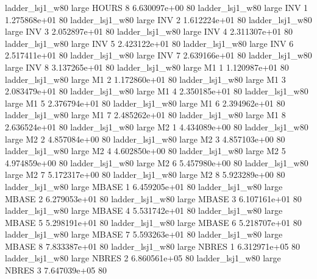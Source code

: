     ladder_lsj1_w80      large    HOURS                 8 6.630097e+00 80
    ladder_lsj1_w80      large      INV                 1 1.275868e+01 80
    ladder_lsj1_w80      large      INV                 2 1.612224e+01 80
    ladder_lsj1_w80      large      INV                 3 2.052897e+01 80
    ladder_lsj1_w80      large      INV                 4 2.311307e+01 80
    ladder_lsj1_w80      large      INV                 5 2.423122e+01 80
    ladder_lsj1_w80      large      INV                 6 2.517411e+01 80
    ladder_lsj1_w80      large      INV                 7 2.639166e+01 80
    ladder_lsj1_w80      large      INV                 8 3.137265e+01 80
    ladder_lsj1_w80      large       M1                 1 1.120987e+01 80
    ladder_lsj1_w80      large       M1                 2 1.172860e+01 80
    ladder_lsj1_w80      large       M1                 3 2.083479e+01 80
    ladder_lsj1_w80      large       M1                 4 2.350185e+01 80
    ladder_lsj1_w80      large       M1                 5 2.376794e+01 80
    ladder_lsj1_w80      large       M1                 6 2.394962e+01 80
    ladder_lsj1_w80      large       M1                 7 2.485262e+01 80
    ladder_lsj1_w80      large       M1                 8 2.636524e+01 80
    ladder_lsj1_w80      large       M2                 1 4.434089e+00 80
    ladder_lsj1_w80      large       M2                 2 4.857084e+00 80
    ladder_lsj1_w80      large       M2                 3 4.857103e+00 80
    ladder_lsj1_w80      large       M2                 4 4.602850e+00 80
    ladder_lsj1_w80      large       M2                 5 4.974859e+00 80
    ladder_lsj1_w80      large       M2                 6 5.457980e+00 80
    ladder_lsj1_w80      large       M2                 7 5.172317e+00 80
    ladder_lsj1_w80      large       M2                 8 5.923289e+00 80
    ladder_lsj1_w80      large    MBASE                 1 6.459205e+01 80
    ladder_lsj1_w80      large    MBASE                 2 6.279053e+01 80
    ladder_lsj1_w80      large    MBASE                 3 6.107161e+01 80
    ladder_lsj1_w80      large    MBASE                 4 5.531742e+01 80
    ladder_lsj1_w80      large    MBASE                 5 5.298191e+01 80
    ladder_lsj1_w80      large    MBASE                 6 5.218707e+01 80
    ladder_lsj1_w80      large    MBASE                 7 5.593263e+01 80
    ladder_lsj1_w80      large    MBASE                 8 7.833387e+01 80
    ladder_lsj1_w80      large    NBRES                 1 6.312971e+05 80
    ladder_lsj1_w80      large    NBRES                 2 6.860561e+05 80
    ladder_lsj1_w80      large    NBRES                 3 7.647039e+05 80
